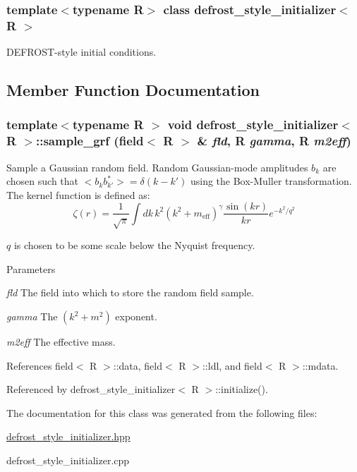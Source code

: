 \subsubsection*{template$<$typename R$>$ class defrost\_\-style\_\-initializer$<$ R $>$}

DEFROST-\/style initial conditions. 

\subsection{Member Function Documentation}
\hypertarget{classdefrost__style__initializer_a37b1d166d031097073140552513bc132}{
\subsubsection[{sample\_\-grf}]{\setlength{\rightskip}{0pt plus 5cm}template$<$typename R $>$ void {\bf defrost\_\-style\_\-initializer}$<$ R $>$::sample\_\-grf ({\bf field}$<$ R $>$ \& {\em fld}, \/  R {\em gamma}, \/  R {\em m2eff})}}
\label{classdefrost__style__initializer_a37b1d166d031097073140552513bc132}


Sample a Gaussian random field. Random Gaussian-\/mode amplitudes $b_k$ are chosen such that $<b_k b^*_{k'}> = \delta(k - k')$ using the Box-\/Muller transformation. The kernel function is defined as: \[ \zeta(r) = \frac{1}{\sqrt{\pi}} \int dk \, k^2 (k^2 + m_{\mbox{eff}})^\gamma \frac{\sin(kr)}{kr} e^{-k^2/q^2} \]

$q$ is chosen to be some scale below the Nyquist frequency.


\begin{DoxyParams}{Parameters}
\item[{\em fld}]The field into which to store the random field sample. \item[{\em gamma}]The $(k^2 + m^2)$ exponent. \item[{\em m2eff}]The effective mass. \end{DoxyParams}


References field$<$ R $>$::data, field$<$ R $>$::ldl, and field$<$ R $>$::mdata.

Referenced by defrost\_\-style\_\-initializer$<$ R $>$::initialize().

The documentation for this class was generated from the following files:\begin{DoxyCompactItemize}
\item 
\hyperlink{defrost__style__initializer_8hpp}{defrost\_\-style\_\-initializer.hpp}\item 
defrost\_\-style\_\-initializer.cpp\end{DoxyCompactItemize}
